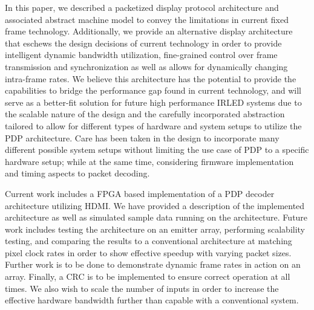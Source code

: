 \label{chap:conclusion}
In this paper, we described a packetized display protocol architecture and associated abstract machine model to convey the limitations in current fixed frame technology. Additionally, we provide an alternative display architecture that eschews the design decisions of current technology in order to provide intelligent dynamic bandwidth utilization, fine-grained control over frame transmission and synchronization as well as allows for dynamically changing intra-frame rates. We believe this architecture has the potential to provide the capabilities to bridge the performance gap found in current technology, and will serve as a better-fit solution for future high performance IRLED systems due to the scalable nature of the design and the carefully incorporated abstraction tailored to allow for different types of hardware and system setups to utilize the PDP architecture. Care has been taken in the design to incorporate many different possible system setups without limiting the use case of PDP to a specific hardware setup; while at the same time, considering firmware implementation and timing aspects to packet decoding.

Current work includes a FPGA based implementation of a PDP decoder architecture utilizing HDMI. We have provided a description of the implemented architecture as well as simulated sample data running on the architecture. Future work includes testing the architecture on an emitter array, performing scalability testing, and comparing the results to a conventional architecture at matching pixel clock rates in order to show effective speedup with varying packet sizes. Further work is to be done to demonstrate dynamic frame rates in action on an array. Finally, a CRC is to be implemented to ensure correct operation at all times. We also wish to scale the number of inputs in order to increase the effective hardware bandwidth further than capable with a conventional system.
